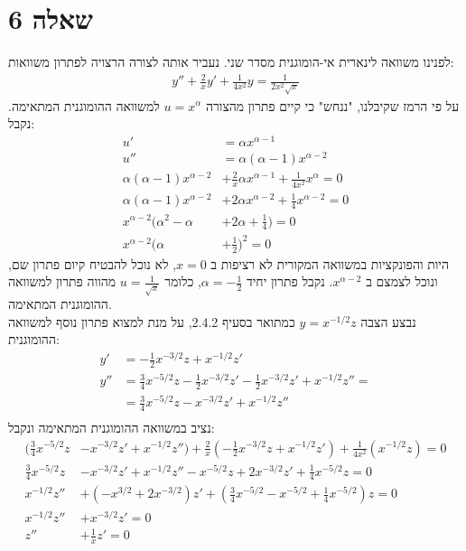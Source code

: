 \documentclass{article}
\begin{document}
\pagebreak

\section*{שאלה 6}
לפנינו משוואה לינארית אי-הומוגנית מסדר שני. נעביר אותה לצורה הרצויה לפתרון משוואות:
\begin{align*}
    y''+\frac{2}{x}y'+\frac{1}{4x^2}y=\frac{1}{2x^2\sqrt{x}}
\end{align*}
על פי הרמז שקיבלנו, "ננחש" כי קיים פתרון מהצורה $u=x^\alpha$ למשוואה ההומוגנית המתאימה. נקבל:
\begin{align*}
    u'                                & =\alpha x^{\alpha -1}                                          \\
    u''                               & =\alpha(\alpha-1) x^{\alpha -2}                                \\
    \alpha(\alpha-1)x^{\alpha-2}      & + \frac{2}{x}\alpha x^{\alpha -1}+\frac{1}{4x^2}x^{\alpha} = 0 \\
    \alpha(\alpha-1)x^{\alpha-2}      & + 2\alpha x^{\alpha -2}+\frac{1}{4}x^{\alpha-2} = 0            \\
    x^{\alpha -2} (\alpha ^2 - \alpha & + 2\alpha + \frac{1}{4}) = 0                                   \\
    x^{\alpha -2} (\alpha             & + \frac{1}{2})^2 = 0
\end{align*}
היות והפונקציות במשוואה המקורית לא רציפות ב $x=0$, לא נוכל להבטיח קיום פתרון שם, ונוכל לצמצם ב $x^{\alpha-2}$. נקבל פתרון יחיד $\alpha=-\frac{1}{2}$, כלומר $u=\frac{1}{\sqrt{x}}$ מהווה פתרון למשוואה ההומוגנית המתאימה. \\
נבצע הצבה $y=x^{-1/2}z$ כמתואר בסעיף 2.4.2, על מנת למצוא פתרון נוסף למשוואה ההומוגנית:
\begin{align*}
    y'  & =-\frac{1}{2}x^{-3/2}z + x^{-1/2}z'                                                    \\
    y'' & = \frac{3}{4}x^{-5/2}z - \frac{1}{2}x^{-3/2}z' - \frac{1}{2}x^{-3/2}z' + x^{-1/2}z'' = \\
        & = \frac{3}{4}x^{-5/2}z - x^{-3/2}z' + x^{-1/2}z''                                      \\
\end{align*}
נציב במשוואה ההומוגנית המתאימה ונקבל:
\begin{align*}
    (\frac{3}{4}x^{-5/2}z & - x^{-3/2}z' + x^{-1/2}z'')+\frac{2}{x}(-\frac{1}{2}x^{-3/2}z + x^{-1/2}z')+\frac{1}{4x^2}(x^{-1/2}z) = 0 \\
    \frac{3}{4}x^{-5/2}z  & - x^{-3/2}z' + x^{-1/2}z'' -x^{-5/2}z + 2x^{-3/2}z' + \frac{1}{4}x^{-5/2}z = 0                            \\
    x^{-1/2}z''           & + (-x^{3/2}+2x^{-3/2})z'+(\frac{3}{4}x^{-5/2}-x^{-5/2}+\frac{1}{4}x^{-5/2})z=0                            \\
    x^{-1/2}z''           & + x^{-3/2}z'=0                                                                                            \\
    z''                   & + \frac{1}{x}z' = 0
\end{align*}
\end{document}
